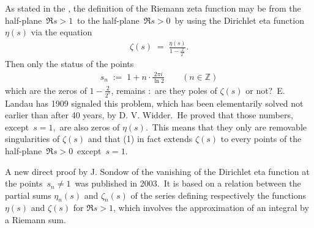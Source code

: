 \documentclass[12pt]{article}
\theoremstyle{definition}
\begin{document}
As stated in the , the definition of the Riemann zeta function may be  from the half-plane \,$\Re{s} > 1$\, to the half-plane \,$\Re{s} > 0$\, by using the Dirichlet eta function $\eta(s)$ via the equation 
\begin{align}
\zeta(s) \;=\; \frac{\eta(s)}{1-\frac{2}{2^s}}.
\end{align}
Then only the status of the points
\begin{align}
s_n \;:=\; 1\!+\!n\!\cdot\!\frac{2\pi i}{\ln{2}}\qquad(n\in\mathbb{Z})
\end{align}
which are the zeros of $1\!-\!\frac{2}{2^s}$, remains :\, are they poles of $\zeta(s)$ or not?\, E. Landau has 1909 signaled this problem, which has been elementarily solved not earlier than after 40 years, by D. V. Widder.\, He proved that those numbers, except\, $s = 1$,\, are also zeros of $\eta(s)$.\, This means that they only are removable singularities of $\zeta(s)$ and that (1) in fact extends $\zeta(s)$ to every points of the half-plane\, 
$\Re{s} > 0$\, except\, $s = 1$.

A new direct proof by J. Sondow of the vanishing of the Dirichlet eta function at the points\, $s_n \neq 1$\, was published in 2003.\, It is based on a  relation between the partial sums $\eta_n(s)$ and 
$\zeta_n(s)$ of the series defining respectively the functions $\eta(s)$ and $\zeta(s)$ for $\Re{s} > 1$, which involves the approximation of an integral by a Riemann sum.
\end{document}
